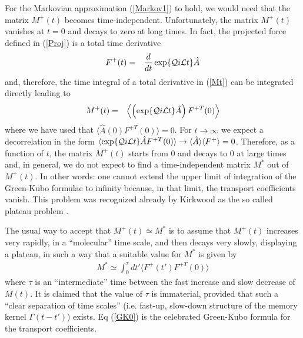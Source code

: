\documentclass[a4paper,openright,12pt]{book}
\newcommand{\llangle}{\left\langle}
\newcommand{\rrangle}{\right\rangle}
\begin{document}
For the Markovian approximation (\ref{Markov1}) to hold, we would need
that the matrix  $M^+(t)$ becomes time-independent.   Unfortunately,  the  matrix
$M^+(t)$ vanishes at $t=0$ and decays to zero at long times. In
fact,  the projected  force defined  in (\ref{Proj})  is a  total time
derivative
\begin{eqnarray}
  F^+ (t)&=&\frac{d}{dt}\exp\{{\cal Q}i{\cal L}t\} \hat{A}  
\end{eqnarray}
and, therefore, the time integral  of a total derivative in (\ref{Mt})
can be integrated directly leading to
\begin{eqnarray}
M^+(t)&=&
  \llangle\left(\exp\{{\cal Q}i{\cal L}t\}  \hat{A}\right)F^{+T}(0)  \rrangle
\label{m+}
\end{eqnarray}
where we  have used that  $ \langle \hat{A} (0)  F^{+T}(0) \rangle=0$.
For  $t\to\infty$ we  expect a  decorrelation  in the  form $  \langle
\exp\{{\cal   Q}i{\cal  L}t\}   \hat{A}F^{+T}(0)  \rangle\to   \langle
\hat{A}\rangle \langle  F^+\rangle =0$.   Therefore, as a  function of
$t$, the matrix $M^+(t)$ starts from 0  and decays to 0 at large times
and, in  general, we do not  expect to find a  time-independent matrix
$M^*$  out  of  $M^+(t)$.   
In other words: one cannot extend  the upper limit of
integration of  the Green-Kubo formulae  to infinity because,  in that
limit, the transport  coefficients vanish. 
This problem  was  recognized  already  by
Kirkwood      as      the      so     called      plateau      problem
\cite{Kirkwood1949, Espanol1992}.

The usual  way to  accept that  $M^+(t)\simeq M^*$  is to  assume that
$M^+(t)$ increases  very rapidly, in  a ``molecular'' time  scale, and
then decays  very slowly, displaying a  plateau, in such a  way that a
suitable value for $M^*$ is given by
\begin{align}
  M^* \simeq \int_0^{\tau} dt'\langle F^+ (t') F^{+T}(0)\rangle 
\label{GK0}
\end{align}
where $\tau$ is an  ``intermediate'' time between  the fast
increase and slow decrease of $M(t)$.  It is claimed that the value of
$\tau$ is immaterial, provided that  such a ``clear separation of time
scales''  (i.e.  fast-up, slow-down  structure  of  the memory  kernel
$\Gamma(t-t')$) exists.  Eq (\ref{GK0})  is the  celebrated Green-Kubo
formula for the transport coefficients.
\end{document}
